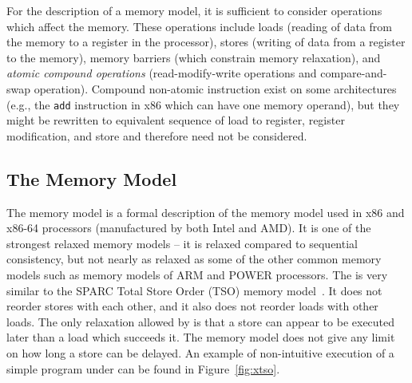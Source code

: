 For the description of a memory model, it is sufficient to consider operations
which affect the memory.
These operations include loads (reading of data from the memory to a register
in the processor), stores (writing of data from a register to the memory),
memory barriers (which constrain memory relaxation), and \emph{atomic compound
operations} (read-modify-write operations and compare-and-swap operation).
Compound non-atomic instruction exist on some architectures (e.g., the
\texttt{add} instruction in x86 which can have one memory operand), but they
might be rewritten to equivalent sequence of load to register, register
modification, and store and therefore need not be considered.

\subsection{The \xtso Memory Model}


The \xtso memory model is a formal description of the memory model used in x86
and x86-64 processors (manufactured by both Intel and AMD).
It is one of the strongest relaxed memory models -- it is relaxed compared to
sequential consistency, but not nearly as relaxed as some of the other common
memory models such as memory models of ARM and POWER processors.
The \xtso is very similar to the SPARC Total Store Order (TSO) memory
model~.
It does not reorder stores with each other, and it also does not reorder loads
with other loads.
The only relaxation allowed by \xtso is that a store can appear to be executed
later than a load which succeeds it.
The memory model does not give any limit on how long a store can be delayed.
An example of non-intuitive execution of a simple program under \xtso can be
found in Figure~\ref{fig:xtso}.

